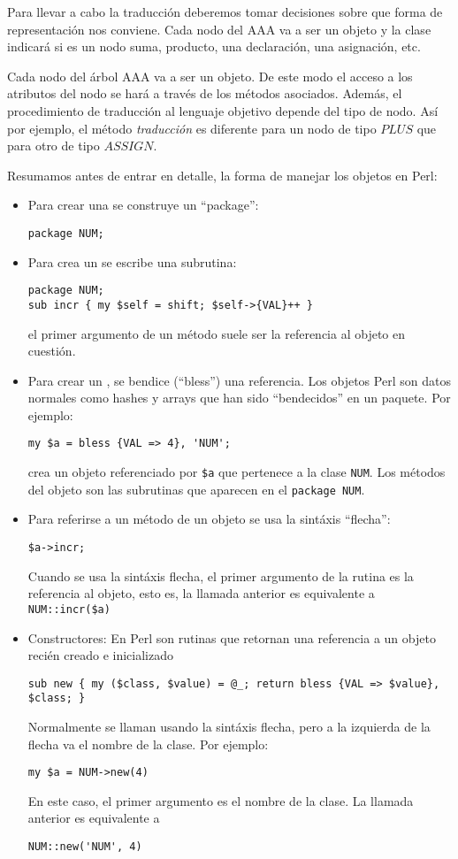Para llevar a cabo la traducción deberemos 
tomar decisiones sobre que forma de representación nos conviene.
Cada nodo del AAA va a ser un objeto y la clase indicará si es un nodo
suma, producto, una declaración, una asignación, etc. 

Cada nodo del árbol AAA va a ser un objeto. 
De este modo el acceso a los atributos del nodo se hará a través de
los métodos asociados. Además, el procedimiento de traducción
al lenguaje objetivo depende del tipo de nodo. Así por ejemplo,
el método \emph{traducción}
es diferente para un nodo de tipo $PLUS$ que para otro de tipo $ASSIGN$.

Resumamos antes de entrar en detalle, la forma de manejar los
objetos en Perl:

\begin{itemize}
\item
Para crear una  se construye un ``package'':
\begin{verbatim}
package NUM;
\end{verbatim}
\item
Para crea un  se escribe una subrutina:
\begin{verbatim}
package NUM;
sub incr { my $self = shift; $self->{VAL}++ }
\end{verbatim}
el primer argumento de un método suele ser la referencia al 
objeto en cuestión.
\item
Para crear un , se bendice (``bless'') una referencia.
Los objetos Perl son datos normales como hashes y arrays que han sido 
``bendecidos'' en un paquete. Por ejemplo:
\begin{verbatim}
my $a = bless {VAL => 4}, 'NUM';
\end{verbatim}
crea un objeto referenciado por \verb|$a| que pertenece a la clase \verb|NUM|.
Los métodos del objeto son las subrutinas que aparecen en el \verb|package NUM|.
\item
Para referirse a un método de un objeto se usa la sintáxis ``flecha'':
\begin{verbatim}
$a->incr;
\end{verbatim}
Cuando se usa la sintáxis flecha, el primer argumento de la rutina es 
la referencia al objeto, esto es, la llamada anterior es equivalente a
\verb|NUM::incr($a)|
\item
Constructores: En Perl son rutinas que retornan una referencia a un objeto 
recién creado e inicializado
\begin{verbatim}
sub new { my ($class, $value) = @_; return bless {VAL => $value}, $class; }
\end{verbatim}
Normalmente se llaman usando la sintáxis flecha, pero a la izquierda de la
flecha va el nombre de la clase. Por ejemplo:

\verb|my $a = NUM->new(4)| 

En este caso,
el primer argumento es el nombre de la clase. La llamada anterior es
equivalente a 

\verb|NUM::new('NUM', 4)|
\end{itemize}


